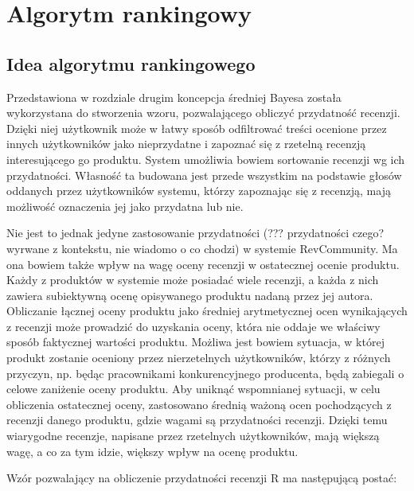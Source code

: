 \chapter{Algorytm rankingowy}

\section{Idea algorytmu rankingowego}

Przedstawiona w rozdziale drugim koncepcja średniej Bayesa została wykorzystana do stworzenia wzoru, pozwalającego obliczyć przydatność recenzji. Dzięki niej użytkownik może w łatwy sposób odfiltrować treści ocenione przez innych użytkowników jako nieprzydatne i zapoznać się z rzetelną recenzją interesującego go produktu. System umożliwia bowiem sortowanie recenzji wg ich przydatności. Własność ta budowana jest przede wszystkim na podstawie głosów oddanych przez użytkowników systemu, którzy zapoznając się z recenzją, mają możliwość oznaczenia jej jako przydatna lub nie.

Nie jest to jednak jedyne zastosowanie przydatności (??? przydatności czego? wyrwane z kontekstu, nie wiadomo o co chodzi)  w systemie RevCommunity. Ma ona bowiem także wpływ na wagę oceny recenzji w ostatecznej ocenie produktu. Każdy z produktów w systemie może posiadać wiele recenzji, a każda z nich zawiera subiektywną ocenę opisywanego produktu nadaną przez jej autora. Obliczanie łącznej oceny produktu jako średniej arytmetycznej ocen wynikających z recenzji może prowadzić do uzyskania oceny, która nie oddaje we właściwy sposób faktycznej wartości produktu. Możliwa jest bowiem sytuacja, w której produkt zostanie oceniony przez nierzetelnych użytkowników, którzy z różnych przyczyn, np. będąc pracownikami konkurencyjnego producenta, będą zabiegali o celowe zaniżenie oceny produktu. Aby uniknąć wspomnianej sytuacji, w celu obliczenia ostatecznej oceny, zastosowano średnią ważoną ocen pochodzących z recenzji danego produktu, gdzie wagami są przydatności recenzji. Dzięki temu wiarygodne recenzje, napisane przez rzetelnych użytkowników, mają większą wagę, a co za tym idzie, większy wpływ na ocenę produktu. 

Wzór pozwalający na obliczenie przydatności recenzji R ma następującą postać:

